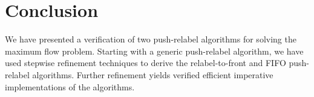 \documentclass[11pt,a4paper]{article}
\begin{document}


\section{Conclusion}\label{sec:concl}
  We have presented a verification of two push-relabel algorithms for solving
  the maximum flow problem. Starting with a generic push-relabel algorithm,
  we have used stepwise refinement techniques to derive the relabel-to-front
  and FIFO push-relabel algorithms. Further refinement yields 
  verified efficient imperative implementations of the algorithms.
  


\end{document}
